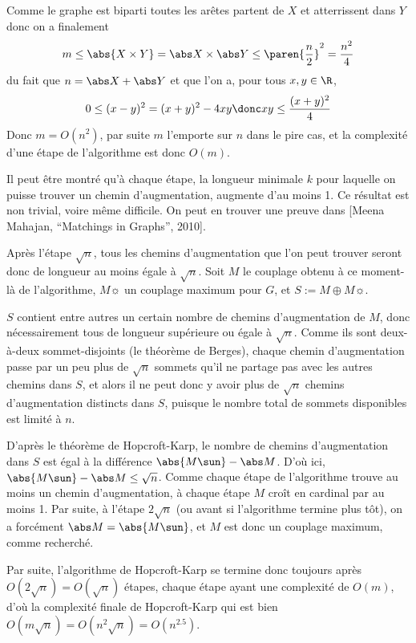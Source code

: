  Comme le graphe est biparti toutes les arêtes partent de $X$ et atterrissent dans $Y$ donc on a finalement
 \[ m \leq \abs {X \times  Y} = \abs X \times \abs Y \leq \paren{\dfrac n 2}^2 = \dfrac {n^2} 4 \]
 du fait que $n = \abs X + \abs Y$ et que l'on a, pour tous $x,y \in \R$,
 \[0 \leq (x - y)^2  = (x + y)^2 - 4xy \donc xy \leq \frac{(x + y)^2}{4} \]
 Donc $m = O(n^2)$, par suite $m$ l'emporte sur $n$ dans le pire cas, et la complexité d'une étape de l'algorithme est donc $O(m)$.
 
 Il peut être montré qu'à chaque étape, la longueur minimale $k$ pour laquelle on puisse trouver un chemin d'augmentation, augmente d'au moins 1. Ce résultat est non trivial, voire même difficile. On peut en trouver une preuve dans [Meena Mahajan, ``Matchings in Graphs'', 2010].
 
 Après l'étape $\sqrt n$, tous les chemins d'augmentation que l'on peut trouver seront donc de longueur au moins égale à $\sqrt n$. Soit $M$ le couplage obtenu à ce moment-là de l'algorithme, $M\sun$ un couplage maximum pour $G$, et $S := M \oplus M\sun$.
 
 $S$ contient entre autres un certain nombre de chemins d'augmentation de $M$, donc nécessairement tous de longueur supérieure ou égale à $\sqrt n$. Comme ils sont deux-à-deux sommet-disjoints (\cf le théorème de Berges), chaque chemin d'augmentation passe par un peu plus de $\sqrt n$ sommets qu'il ne partage pas avec les autres chemins dans $S$, et alors il ne peut donc y avoir plus de $\sqrt n$ chemins d'augmentation distincts dans $S$, puisque le nombre total de sommets disponibles est limité à $n$.
 
 D'après le théorème de Hopcroft-Karp, le nombre de chemins d'augmentation dans $S$ est égal à la différence $\abs {M\sun} - \abs M$. D'où ici, $\abs {M\sun} - \abs M \leq \sqrt n$. Comme chaque étape de l'algorithme trouve au moins un chemin d'augmentation, à chaque étape $M$ croît en cardinal par au moins 1. Par suite, à l'étape $2 \sqrt n$ (ou avant si l'algorithme termine plus tôt), on a forcément $\abs M = \abs {M\sun}$, et $M$ est donc un couplage maximum, comme recherché.
 
 Par suite, l'algorithme de Hopcroft-Karp se termine donc toujours après $O(2\sqrt n) = O(\sqrt n)$ étapes, chaque étape ayant une complexité de $O(m)$, d'où la complexité finale de Hopcroft-Karp qui est bien $O(m \sqrt n) = O(n^2 \sqrt n) = O(n^{2.5})$.
 

